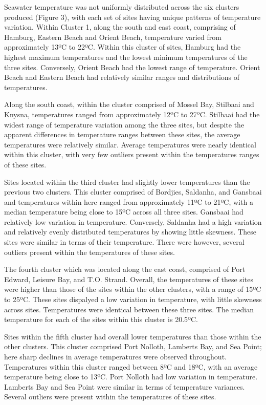 \documentclass[12pt,A4paper,]{article}
\begin{document}
Seawater temperature was not uniformly distributed across the six
clusters produced (Figure 3), with each set of sites having unique
patterns of temperature variation. Within Cluster 1, along the south and
east coast, comprising of Hamburg, Eastern Beach and Orient Beach,
temperature varied from approximately 13ºC to 22ºC. Within this cluster
of sites, Hamburg had the highest maximum temperatures and the lowest
minimum temperatures of the three sites. Conversely, Orient Beach had
the lowest range of temperature. Orient Beach and Eastern Beach had
relatively similar ranges and distributions of temperatures.

Along the south coast, within the cluster comprised of Mossel Bay,
Stilbaai and Knysna, temperatures ranged from approximately 12ºC to
27ºC. Stilbaai had the widest range of temperature variation among the
three sites, but despite the apparent differences in temperature ranges
between these sites, the average temperatures were relatively similar.
Average temperatures were nearly identical within this cluster, with
very few outliers present within the temperatures ranges of these sites.

Sites located within the third cluster had slightly lower temperatures
than the previous two clusters. This cluster comprised of Bordjies,
Saldanha, and Gansbaai and temperatures within here ranged from
approximately 11ºC to 21ºC, with a median temperature being close to
15ºC across all three sites. Gansbaai had relatively low variation in
temperature. Conversely, Saldanha had a high variation and relatively
evenly distributed temperatures by showing little skewness. These sites
were similar in terms of their temperature. There were however, several
outliers present within the temperatures of these sites.

The fourth cluster which was located along the east coast, comprised of
Port Edward, Leisure Bay, and T.O. Strand. Overall, the temperatures of
these sites were higher than those of the sites within the other
clusters, with a range of 15ºC to 25ºC. These sites dispalyed a low
variation in temperature, with little skewness across sites.
Temperatures were identical between these three sites. The median
temperature for each of the sites within this cluster is 20.5ºC.

Sites within the fifth cluster had overall lower temperatures than those
within the other clusters. This cluster comprised Port Nolloth, Lamberts
Bay, and Sea Point; here sharp declines in average temperatures were
observed throughout. Temperatures within this cluster ranged between 8ºC
and 18ºC, with an average temperature being close to 13ºC. Port Nolloth
had low variation in temperature. Lamberts Bay and Sea Point were
similar in terms of temperature variances. Several outliers were present
within the temperatures of these sites.
\end{document}
